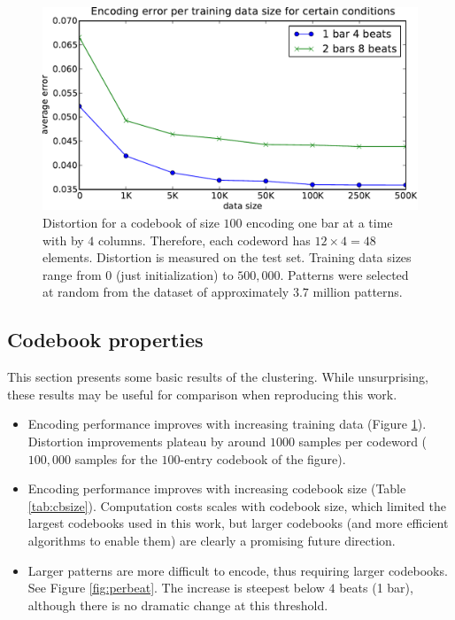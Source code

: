 \documentclass{article}
\begin{document}
\begin{figure}[t]
\begin{center}
\includegraphics[width=.8\columnwidth]{data_sizes}
\end{center}
\caption{\small{Distortion for a codebook of size $100$ encoding one bar
at a time with by $4$ columns.
Therefore, each codeword has $12 \times 4 = 48$ elements.
Distortion is measured on the test set.  Training data sizes range
from $0$ (just initialization) to $500,000$. Patterns were selected at
random from the dataset of approximately $3.7$ million patterns.
}}
\label{fig:data_sizes}
\end{figure}




\subsection{Codebook properties}
This section presents some basic results of the clustering.
While unsurprising, these results may be useful for comparison 
when reproducing this work.
\begin{itemize}
\item Encoding performance improves with increasing training data (Figure
\ref{fig:data_sizes}). Distortion improvements plateau by around $1000$ samples 
per codeword ($100,000$ samples for the $100$-entry codebook of the figure).
\item Encoding performance improves with increasing codebook size
(Table \ref{tab:cbsize}).  Computation costs scales with codebook size, 
which limited the largest codebooks used in this work, but larger codebooks 
(and more efficient algorithms to enable them) are clearly a promising future 
direction.
\item Larger patterns are more difficult to encode, thus requiring
larger codebooks. See Figure \ref{fig:perbeat}. The increase is steepest
below $4$ beats (1 bar), although there is no dramatic change at 
this threshold.
\end{itemize}
\end{document}
